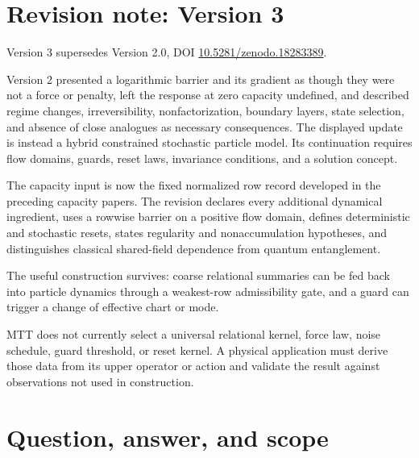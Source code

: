 \documentclass[11pt]{article}
\theoremstyle{definition}
\theoremstyle{remark}
\begin{document}
\section*{Revision note: Version 3}
\begin{description}[leftmargin=2.5cm,style=nextline]
\item[Supersedes]
Version 3 supersedes Version 2.0, DOI
\href{https://doi.org/10.5281/zenodo.18283389}
{10.5281/zenodo.18283389}.

\item[Reason]
Version 2 presented a logarithmic barrier and its gradient as though they
were not a force or penalty, left the response at zero capacity undefined,
and described regime changes, irreversibility, nonfactorization, boundary
layers, state selection, and absence of close analogues as necessary
consequences.  The displayed update is instead a hybrid constrained
stochastic particle model.  Its continuation requires flow domains, guards,
reset laws, invariance conditions, and a solution concept.

\item[Resolution]
The capacity input is now the fixed normalized row record developed in the
preceding capacity papers.  The revision declares every additional
dynamical ingredient, uses a rowwise barrier on a positive flow domain,
defines deterministic and stochastic resets, states regularity and
nonaccumulation hypotheses, and distinguishes classical shared-field
dependence from quantum entanglement.

\item[Retained content]
The useful construction survives: coarse relational summaries can be fed
back into particle dynamics through a weakest-row admissibility gate, and a
guard can trigger a change of effective chart or mode.

\item[Remaining boundary]
MTT does not currently select a universal relational kernel, force law,
noise schedule, guard threshold, or reset kernel.  A physical application
must derive those data from its upper operator or action and validate the
result against observations not used in construction.
\end{description}

\tableofcontents

\section{Question, answer, and scope}
\label{sec:intro}
\end{document}
